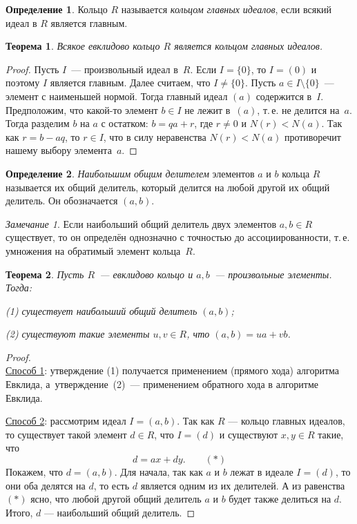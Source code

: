 \documentclass[a4paper,10pt]{amsart}
\newtheorem{theorem}{Теорема}
\theoremstyle{definition}
\newtheorem{definition}{Определение}
\theoremstyle{remark}
\newtheorem{remark}{Замечание}
\begin{document}
\begin{definition}
Кольцо $R$ называется \textit{кольцом главных идеалов}, если всякий
идеал в $R$ является главным.
\end{definition}

\begin{theorem} \label{thm_er_rpi}
Всякое евклидово кольцо $R$ является кольцом главных идеалов.
\end{theorem}

\begin{proof}
Пусть $I$~--- произвольный идеал в~$R$. Если $I = \lbrace 0
\rbrace$, то $I = (0)$ и поэтому $I$ является главным. Далее
считаем, что $I \ne \lbrace 0 \rbrace$. Пусть $a \in I \setminus
\lbrace 0 \rbrace$~--- элемент с наименьшей нормой. Тогда главный
идеал $(a)$ содержится в~$I$. Предположим, что какой-то элемент $b
\in I$ не лежит в~$(a)$, т.\,е. не делится на~$a$. Тогда разделим
$b$ на $a$ с остатком: $b = qa + r$, где $r \ne 0$ и $N(r) < N(a)$.
Так как $r = b - aq$, то $r \in I$, что в силу неравенства $N(r) <
N(a)$ противоречит нашему выбору элемента~$a$.
\end{proof}

\begin{definition}
{\it Наибольшим общим делителем} элементов $a$ и $b$ кольца $R$
называется их общий делитель, который делится на любой другой их
общий делитель. Он обозначается $(a,b)$.
\end{definition}

\begin{remark}
Если наибольший общий делитель двух элементов $a,b \in R$
существует, то он определён однозначно с точностью до
ассоциированности, т.\,е. умножения на обратимый элемент кольца~$R$.
\end{remark}

\begin{theorem} \label{thm_lcd}
Пусть $R$~--- евклидово кольцо и $a,b$~--- произвольные элементы.
Тогда:

\textup{(1)} существует наибольший общий делитель $(a,b)$;

\textup{(2)} существуют такие элементы $u,v \in R$, что $(a,b) = ua
+ vb$.
\end{theorem}

\begin{proof}\ \\
\underline{Способ 1}:  утверждение (1) получается применением
(прямого хода) алгоритма Евклида, а~утверждение~(2)~--- применением
обратного хода в алгоритме Евклида.

\underline{Способ 2}: рассмотрим идеал $I = (a, b)$. Так как $R$ --- кольцо главных идеалов, то существует такой элемент $d \in R$, что $I = (d)$ и существуют $x, y \in R$ такие, что 
$$
d = ax + dy. \qquad (*)
$$
Покажем, что $d = (a, b)$. Для начала, так как $a$ и $b$ лежат в идеале $I = (d)$, то они оба делятся на $d$, то есть $d$ является одним из их делителей. А из равенства $(*)$ ясно, что любой другой общий делитель $a$ и $b$ будет также делиться на $d$. Итого, $d$ --- наибольший общий делитель.
\end{proof}
\end{document}
